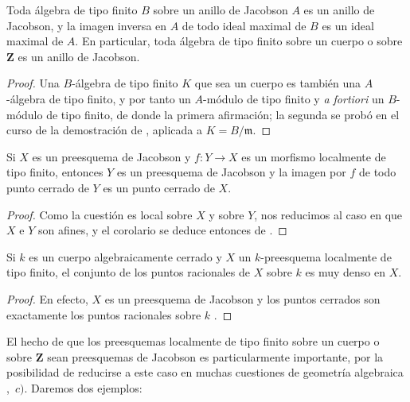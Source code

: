 \begin{corollary}[10.4.6]
\label{IV.10.4.6}
Toda álgebra de tipo finito $B$ sobre un anillo de Jacobson $A$ es un anillo de Jacobson, y la imagen inversa en $A$ de todo ideal maximal de $B$ es un ideal maximal de $A$.
En particular, toda álgebra de tipo finito sobre un cuerpo o sobre $\mathbf{Z}$ es un anillo de Jacobson.
\end{corollary}

\begin{proof}
Una $B$-álgebra de tipo finito $K$ que sea un cuerpo es también una $A$-álgebra de tipo finito, y por tanto un $A$-módulo de tipo finito y \emph{a fortiori} un $B$-módulo de tipo finito, de donde la primera afirmación; la segunda se probó en el curso de la demostración de , aplicada a $K=B/\mathfrak{m}$.
\end{proof}

\begin{corollary}[10.4.7]
\label{IV.10.4.7}
Si $X$ es un preesquema de Jacobson y $f:Y\to X$ es un morfismo localmente de tipo finito, entonces $Y$ es un preesquema de Jacobson y la imagen por $f$ de todo punto cerrado de $Y$ es un punto cerrado de $X$.
\end{corollary}

\begin{proof}
Como la cuestión es local sobre $X$ y sobre $Y$, nos reducimos al caso en que $X$ e $Y$ son afines, y el corolario se deduce entonces de .
\end{proof}

\begin{corollary}[10.4.8]
\label{IV.10.4.8}
Si $k$ es un cuerpo algebraicamente cerrado y $X$ un $k$-preesquema localmente de tipo finito, el conjunto de los puntos racionales de $X$ sobre $k$ es muy denso en $X$.
\end{corollary}

\begin{proof}
En efecto, $X$ es un preesquema de Jacobson  y los puntos cerrados son exactamente los puntos racionales sobre $k$ .
\end{proof}

\begin{env}[10.4.9]
\label{IV.10.4.9}
El hecho de que los preesquemas localmente de tipo finito sobre un cuerpo o sobre $\mathbf{Z}$ sean preesquemas de Jacobson es particularmente importante, por la posibilidad de reducirse a este caso en muchas cuestiones de geometría algebraica ,~$c)$.
Daremos dos ejemplos:
\end{env}

